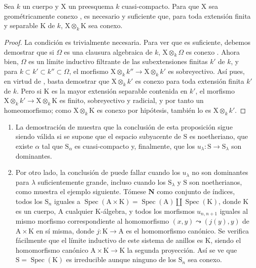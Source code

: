 \begin{corollary}[8.4.5]
\label{IV.8.4.5}
Sea $k$ un cuerpo y $\mathrm{X}$ un preesquema $k$ cuasi-compacto.
Para que $\mathrm{X}$ sea geométricamente conexo , es necesario y suficiente que, para toda extensión finita y separable $\mathrm{K}$ de $k$, $\mathrm{X}\otimes_k\mathrm{K}$ sea conexo.
\end{corollary}

\begin{proof}
La condición es trivialmente necesaria.
Para ver que es suficiente, debemos demostrar que si $\Omega$ es una clausura algebraica de $k$, $\mathrm{X}\otimes_k\Omega$ es conexo .
Ahora bien, $\Omega$ es un límite inductivo filtrante de las subextensiones finitas $k'$ de $k$, y para $k\subset k'\subset k''\subset\Omega$, el morfismo $\mathrm{X}\otimes_k k''\to\mathrm{X}\otimes_k k'$ es sobreyectivo.
Así pues, en virtud de , basta demostrar que $\mathrm{X}\otimes_k k'$ es conexo para toda extensión finita $k'$ de $k$.
Pero si $\mathrm{K}$ es la mayor extensión separable contenida en $k'$, el morfismo $\mathrm{X}\otimes_k k'\to\mathrm{X}\otimes_k\mathrm{K}$ es finito, sobreyectivo y radicial, y por tanto  un homeomorfismo; como $\mathrm{X}\otimes_k\mathrm{K}$ es conexo por hipótesis, también lo es $\mathrm{X}\otimes_k k'$.
\end{proof}

\begin{remark}[8.4.6]
\label{IV.8.4.6}
\begin{enumerate}[label=(\roman*)]
  \item La demostración de  muestra que la conclusión de esta proposición sigue siendo válida si se supone que el espacio subyacente de $\mathrm{S}$ es noetheriano, que existe $\alpha$ tal que $\mathrm{S}_\alpha$ es cuasi-compacto y, finalmente, que los $u_\lambda:\mathrm{S}\to\mathrm{S}_\lambda$ son dominantes.
  \item Por otro lado, la conclusión de  puede fallar cuando los $u_\lambda$ no son dominantes para $\lambda$ suficientemente grande, incluso cuando los $\mathrm{S}_\lambda$ y $\mathrm{S}$ son noetherianos, como muestra el ejemplo siguiente.
Tómese $\mathbf{N}$ como conjunto de índices, todos los $\mathrm{S}_n$ iguales a $\operatorname{Spec}(\mathrm{A}\times\mathrm{K})=\operatorname{Spec}(\mathrm{A})\amalg\operatorname{Spec}(\mathrm{K})$, donde $\mathrm{K}$ es un cuerpo, $\mathrm{A}$ cualquier $\mathrm{K}$-álgebra, y todos los morfismos $u_{n,n+1}$ iguales al mismo morfismo correspondiente al homomorfismo $(x,y)\leadsto(j(y),y)$ de $\mathrm{A}\times\mathrm{K}$ en sí misma, donde $j:\mathrm{K}\to\mathrm{A}$ es el homomorfismo canónico.
Se verifica fácilmente que el límite inductivo de este sistema de anillos es $\mathrm{K}$, siendo el homomorfismo canónico $\mathrm{A}\times\mathrm{K}\to\mathrm{K}$ la segunda proyección.
Así se ve que $\mathrm{S}=\operatorname{Spec}(\mathrm{K})$ es irreducible aunque ninguno de los $\mathrm{S}_n$ sea conexo.
\end{enumerate}
\end{remark}

